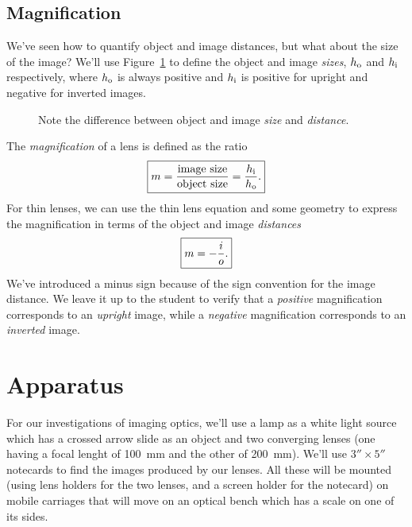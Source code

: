 \subsection{Magnification}

We've seen how to quantify object and image distances, but what about the size
of the image?  We'll use Figure~\ref{fig:opt:sizes} to define the object and
image {\it sizes}, $h_{\rm o}$ and $h_{\rm i}$ respectively, where $h_{\rm o}$
is always positive and $h_{\rm i}$ is positive for upright and negative for
inverted images.
\begin{figure}[htb]
\centerline{\epsfxsize=13cm }
\caption{Note the difference between object and image {\it size} and 
{\it distance}.}
\label{fig:opt:sizes}
\end{figure}
The {\it magnification} of a lens is defined as the ratio
\begin{equation}
\fbox{$ \displaystyle m=\frac{\mbox{image size}}{\mbox{object size}}=
\frac{h_{\rm i}}{h_{\rm o}}. $} \label{eq:opt:magdef}
\end{equation}
For thin lenses, we can use the thin lens equation and some geometry to express
the magnification in terms of the object and image {\it distances}
\begin{equation}
\fbox{$ \displaystyle m= -\frac{i}{o}. $} \label{eq:opt:thinlensmag}
\end{equation}
We've introduced a minus sign because of the sign convention for the image 
distance. We leave it up to the student to verify that a {\it positive} 
magnification corresponds to an {\it upright} image, while a {\it negative}
magnification corresponds to an {\it inverted} image.

\section{Apparatus}

For our investigations of imaging optics, we'll use a lamp as a white light 
source which has a crossed arrow slide as an object and two converging lenses 
(one having a focal lenght of 100~mm and the other of 200~mm).  We'll use
$3''\times 5''$ notecards to find the images produced by our lenses.  All these
will be mounted (using lens holders for the two lenses, and a screen holder for
the notecard)  on mobile carriages that will move on an optical bench which
has a scale on one of its sides. 

\vfill
\pagebreak
$$
$$
\vfill
\clearpage
\newpage


